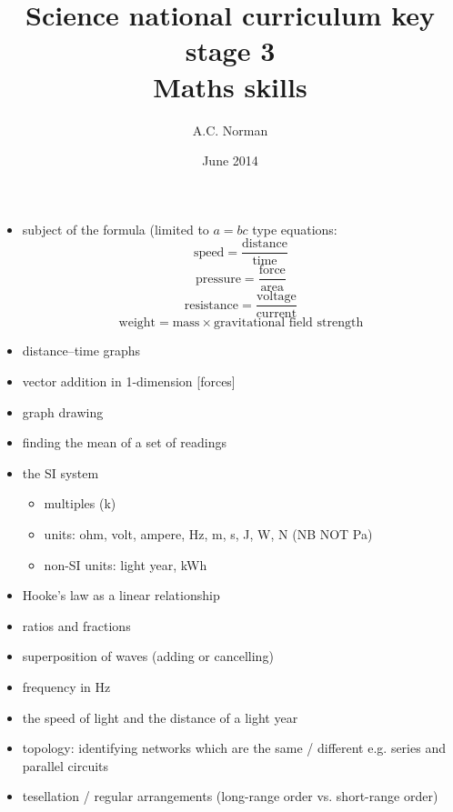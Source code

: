 \documentclass[a4paper,12pt]{article}
\begin{document}
\setcounter{secnumdepth}{0}

\title{Science national curriculum key stage 3\\Maths skills}
\author{A.C. Norman}
\date{June 2014}
\maketitle

\thispagestyle{empty}

\begin{itemize}
\item subject of the formula (limited to $a=bc$ type equations:
\[\text{speed}=\frac{\text{distance}}{\text{time}}\]
\[\text{pressure}=\frac{\text{force}}{\text{area}}\]
\[\text{resistance}=\frac{\text{voltage}}{\text{current}}\]
\[\text{weight}=\text{mass}\times\text{gravitational field strength}\]
\item distance--time graphs
\item vector addition in 1-dimension [forces]
\item graph drawing
\item finding the mean of a set of readings
\item the SI system
\begin{itemize}
\item multiples (k)
\item units: ohm, volt, ampere, Hz, m, s, J, W, N (NB NOT Pa)
\item non-SI units: light year, kWh
\end{itemize}
\item Hooke's law as a linear relationship
\item ratios and fractions
\item superposition of waves (adding or cancelling)
\item frequency in Hz
\item the speed of light and the distance of a light year
\item topology: identifying networks which are the same / different e.g. series and parallel circuits
\item tesellation / regular arrangements (long-range order vs. short-range order)
\end{itemize}
\end{document}
